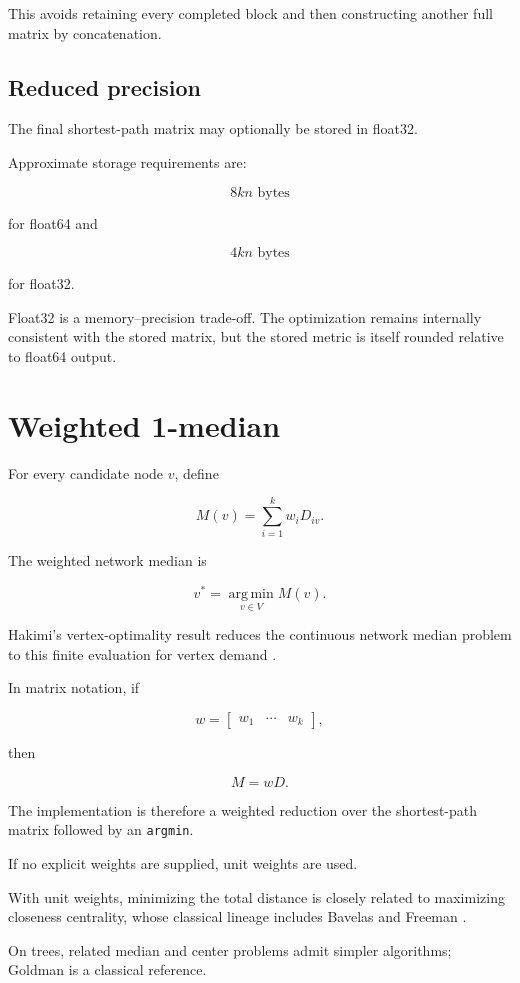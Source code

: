 \documentclass[11pt]{article}
\newcommand{\argmin}{\operatorname*{arg\,min}}
\begin{document}
This avoids retaining every completed block and then constructing another full
matrix by concatenation.

\subsection{Reduced precision}

The final shortest-path matrix may optionally be stored in float32.

Approximate storage requirements are:

\[
8kn \text{ bytes}
\]

for float64 and

\[
4kn \text{ bytes}
\]

for float32.

Float32 is a memory--precision trade-off. The optimization remains internally
consistent with the stored matrix, but the stored metric is itself rounded
relative to float64 output.

\section{Weighted 1-median}

For every candidate node \(v\), define

\[
M(v)
=
\sum_{i=1}^{k}
w_iD_{iv}.
\]

The weighted network median is

\[
v^*
=
\argmin_{v\in V}M(v).
\]

Hakimi's vertex-optimality result reduces the continuous network median problem
to this finite evaluation for vertex demand \cite{Hakimi1964}.

In matrix notation, if

\[
w=
\begin{bmatrix}
w_1 & \cdots & w_k
\end{bmatrix},
\]

then

\[
M=wD.
\]

The implementation is therefore a weighted reduction over the shortest-path
matrix followed by an \texttt{argmin}.

If no explicit weights are supplied, unit weights are used.

With unit weights, minimizing the total distance is closely related to
maximizing closeness centrality, whose classical lineage includes Bavelas
\cite{Bavelas1950} and Freeman \cite{Freeman1978}.

On trees, related median and center problems admit simpler algorithms; Goldman
\cite{Goldman1971} is a classical reference.
\end{document}
